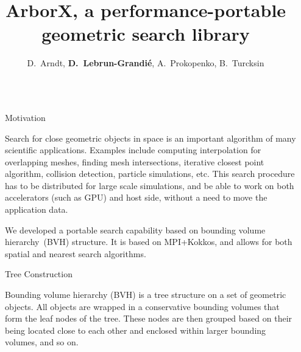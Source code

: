 \documentclass[final,hyperref={pdfpagelabels=false}]{beamer}
\title{\huge ArborX, a performance-portable geometric search library}
\author{D.~Arndt, \textbf{D.~Lebrun-Grandi{\'e}}, A.~Prokopenko, B.~Turcksin}
\institute{Oak Ridge National Laboratory}
\begin{document}

\begin{frame}[t,fragile]

\begin{columns}[t]

\begin{column}{.02\textwidth}\end{column}

\begin{column}{.450\textwidth}

\begin{block}{\centering Motivation}

  Search for close geometric objects in space is an important algorithm of many
  scientific applications.
  Examples include computing interpolation for overlapping meshes, finding
  mesh intersections, iterative closest point algorithm, collision detection, particle simulations, etc.
  This search procedure has to be distributed for large scale simulations, and
  be able to work on both accelerators (such as GPU) and host side, without a
  need to move the application data.

  We developed a portable search capability based on bounding volume
  hierarchy~(BVH) structure. It is based on MPI+Kokkos, and allows for both
  spatial and nearest search algorithms.
\end{block}

\begin{block}{\centering Tree Construction}

  Bounding volume hierarchy (BVH) is a tree structure on a set of geometric
  objects.  All objects are wrapped in a conservative bounding volumes
  that form the leaf nodes of the tree.  These nodes are then grouped based on their
  being located close to each other and enclosed within larger bounding volumes, and so on.


\end{block}
\end{column}
\end{columns}
\end{frame}
\end{document}
